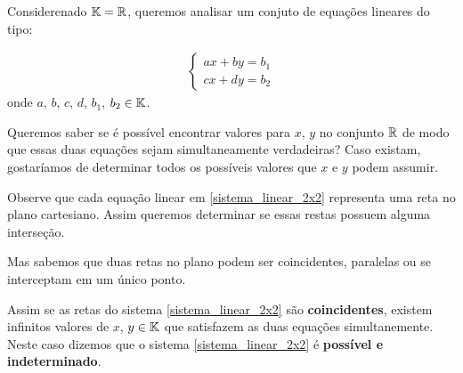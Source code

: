 Considerenado $\mathbb{K} = \mathbb{R}$, queremos analisar um conjuto de equaç\~oes lineares do tipo:

\begin{align}
    \begin{cases}\label{sistema_linear_2x2}
        ax + by = b_1\\
        cx + dy = b_2
    \end{cases}
\end{align}
onde $a$, $b$, $c$, $d$, $b_1$, $b_2 \in \mathbb{K}$.

Queremos saber se é possível encontrar valores para $x$, $y$ no conjunto $\mathbb{R}$ de modo que essas duas equaç\~oes sejam simultaneamente verdadeiras? Caso existam, gostaríamos de determinar todos os possíveis valores que $x$ e $y$ podem assumir.

Observe que cada equação linear em \eqref{sistema_linear_2x2} representa uma reta no plano cartesiano. Assim queremos determinar se essas restas possuem alguma interseção.

Mas sabemos que duas retas no plano podem ser coincidentes, paralelas ou se interceptam em um único ponto.

Assim se as retas do sistema \eqref{sistema_linear_2x2} são \textbf{coincidentes}, existem infinitos valores de $x$, $y \in \mathbb{K}$ que satisfazem as duas equaç\~oes simultanemente. Neste caso dizemos que o sistema \eqref{sistema_linear_2x2} é \textbf{possível e indeterminado}.

\begin{center}
\end{center}

